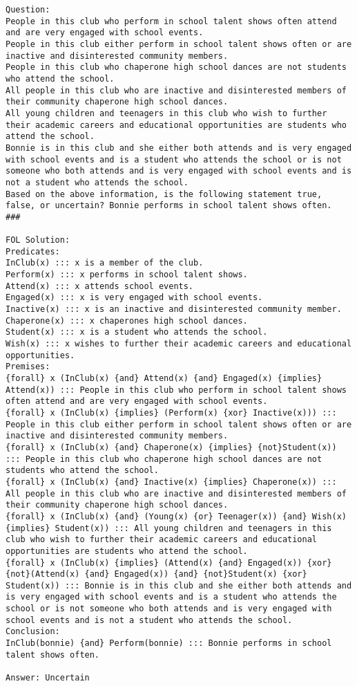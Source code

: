 
\begin{lstlisting}[style=myGrammarStyle, caption=Problem Solution Examples for FOLIO]
Question: 
People in this club who perform in school talent shows often attend and are very engaged with school events.
People in this club either perform in school talent shows often or are inactive and disinterested community members.
People in this club who chaperone high school dances are not students who attend the school.
All people in this club who are inactive and disinterested members of their community chaperone high school dances.
All young children and teenagers in this club who wish to further their academic careers and educational opportunities are students who attend the school. 
Bonnie is in this club and she either both attends and is very engaged with school events and is a student who attends the school or is not someone who both attends and is very engaged with school events and is not a student who attends the school.
Based on the above information, is the following statement true, false, or uncertain? Bonnie performs in school talent shows often.
###

FOL Solution: 
Predicates:
InClub(x) ::: x is a member of the club.
Perform(x) ::: x performs in school talent shows.
Attend(x) ::: x attends school events.
Engaged(x) ::: x is very engaged with school events.
Inactive(x) ::: x is an inactive and disinterested community member.
Chaperone(x) ::: x chaperones high school dances.
Student(x) ::: x is a student who attends the school.
Wish(x) ::: x wishes to further their academic careers and educational opportunities.
Premises:
{forall} x (InClub(x) {and} Attend(x) {and} Engaged(x) {implies} Attend(x)) ::: People in this club who perform in school talent shows often attend and are very engaged with school events.
{forall} x (InClub(x) {implies} (Perform(x) {xor} Inactive(x))) ::: People in this club either perform in school talent shows often or are inactive and disinterested community members.
{forall} x (InClub(x) {and} Chaperone(x) {implies} {not}Student(x)) ::: People in this club who chaperone high school dances are not students who attend the school.
{forall} x (InClub(x) {and} Inactive(x) {implies} Chaperone(x)) ::: All people in this club who are inactive and disinterested members of their community chaperone high school dances.
{forall} x (InClub(x) {and} (Young(x) {or} Teenager(x)) {and} Wish(x) {implies} Student(x)) ::: All young children and teenagers in this club who wish to further their academic careers and educational opportunities are students who attend the school.
{forall} x (InClub(x) {implies} (Attend(x) {and} Engaged(x)) {xor} {not}(Attend(x) {and} Engaged(x)) {and} {not}Student(x) {xor} Student(x)) ::: Bonnie is in this club and she either both attends and is very engaged with school events and is a student who attends the school or is not someone who both attends and is very engaged with school events and is not a student who attends the school.
Conclusion:
InClub(bonnie) {and} Perform(bonnie) ::: Bonnie performs in school talent shows often.

Answer: Uncertain

\end{lstlisting}
\label{gram:folio_example}